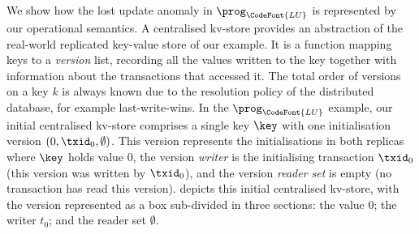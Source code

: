 We show how the  lost update anomaly in
\(\prog_{\CodeFont{LU}}\) is represented by   our operational semantics.  
A centralised kv-store provides an abstraction of the real-world
replicated key-value store of our example.  It is a function mapping
keys to a {\em version} list, recording {all} the values written to the key
together with information about the transactions that
accessed it. The total order of versions on a key $k$ is always known
due to the resolution policy of the distributed database, 
for example last-write-wins. 
In the \(\prog_{\CodeFont{LU}}\) example, our initial centralised
kv-store comprises a single key \(\key\)  with  one initialisation version \((0, \txid_{0}, \emptyset)\).
This version represents the initialisations in both replicas where \(\key\) holds value \(0\), 
 the version \emph{writer} is the initialising transaction
\(\txid_0\) (this version was written by \(\txid_0\)), 
and  the version \emph{reader set} is empty (no transaction has read this version). 
 depicts this initial centralised kv-store, with the version
represented as a box sub-divided in three sections: the value \(0\);
the writer \(t_0\); and the reader set \(\emptyset\). 


